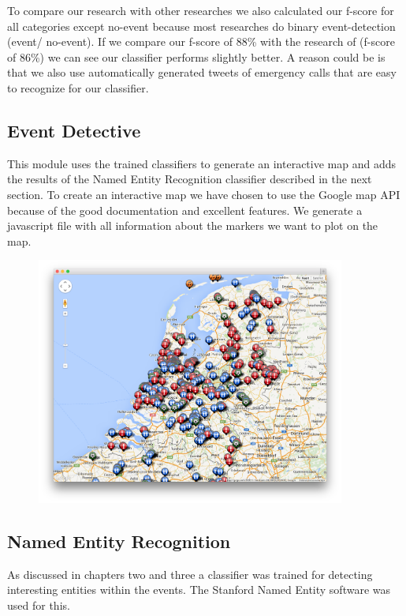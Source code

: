 \documentclass[
10pt, %
a4paper, %
oneside, %
headinclude,footinclude, %
BCOR5mm, %
]{scrartcl}
\begin{document}
\noindent To compare our research with other researches we also calculated our f-score for all categories except no-event because most researches do binary event-detection (event/ no-event). If we compare our f-score of 88\% with the research of \citeauthor{walther2013geo} (f-score of 86\%) we can see our classifier performs slightly better. A reason could be is that we also use automatically generated tweets of emergency calls that are easy to recognize for our classifier.


\subsection{Event Detective}
This module uses the trained classifiers to generate an interactive map and adds the results of the Named Entity Recognition classifier described in the next section. \vl
To create an interactive map we have chosen to use the Google map API because of the good documentation and excellent features. We generate a javascript file with all information about the markers we want to plot on the map. 

\begin{figure}[htbp] %
   \centering
   \includegraphics[width=4in]{voorkant.png} 
   \label{fig:gui}
\end{figure}


\subsection{Named Entity Recognition}
As discussed in chapters two and three a classifier was trained for detecting interesting entities within the events. The Stanford Named Entity software was used for this.
\end{document}
